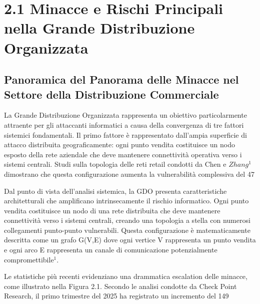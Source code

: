 \section{2.1 Minacce e Rischi Principali nella Grande Distribuzione Organizzata}

\subsection{Panoramica del Panorama delle Minacce nel Settore della Distribuzione Commerciale}

La Grande Distribuzione Organizzata rappresenta un obiettivo particolarmente attraente per gli attaccanti informatici a causa della convergenza di tre fattori sistemici fondamentali. Il primo fattore è rappresentato dall'ampia superficie di attacco distribuita geograficamente: ogni punto vendita costituisce un nodo esposto della rete aziendale che deve mantenere connettività operativa verso i sistemi centrali. Studi sulla topologia delle reti retail condotti da Chen e $Zhang$$^{1}$ dimostrano che questa configurazione aumenta la vulnerabilità complessiva del 47%

Dal punto di vista dell'analisi sistemica, la GDO presenta caratteristiche architetturali che amplificano intrinsecamente il rischio informatico. Ogni punto vendita costituisce un nodo di una rete distribuita che deve mantenere connettività verso i sistemi centrali, creando una topologia a stella con numerosi collegamenti punto-punto vulnerabili. Questa configurazione è matematicamente descritta come un grafo G(V,E) dove ogni vertice V rappresenta un punto vendita e ogni arco E rappresenta un canale di comunicazione potenzialmente compromettibile$^{1}$.

Le statistiche più recenti evidenziano una drammatica escalation delle minacce, come illustrato nella Figura 2.1. Secondo le analisi condotte da Check Point Research, il primo trimestre del 2025 ha registrato un incremento del 149%

